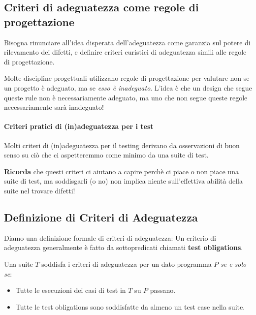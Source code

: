 \subsection*{Criteri di adeguatezza come regole di progettazione}
Bisogna rinunciare all'idea disperata dell'adeguatezza come garanzia sul potere di rilevamento dei difetti,
e definire criteri euristici di adeguatezza simili alle regole di progettazione.

Molte discipline progettuali utilizzano regole di progettazione per valutare non se un progetto è
adeguato, ma se \emph{esso è inadeguato}.
L'idea è che un design che segue queste rule non è necessariamente adeguato, ma uno che non segue queste regole necessariamente sarà inadeguato!

\paragraph{Criteri pratici di (in)adeguatezza per i test}
Molti criteri di (in)adeguatezza per il testing derivano da osservazioni di buon senso su ciò che ci aspetteremmo come minimo da una suite di test.

\textbf{Ricorda} che questi criteri ci aiutano a capire perchè ci piace o non piace una suite di test,
ma soddisgarli (o no) non implica niente sull'effettiva abilità della suite nel trovare difetti!

\subsection{Definizione di Criteri di Adeguatezza}
Diamo una definizione formale di criteri di adeguatezza:
Un criterio di adeguatezza generalmente è fatto da sottopredicati chiamati \textbf{test obligations}.

Una suite $T$ soddisfa i criteri di adeguatezza per un dato programma $P$ \emph{se e solo se}:
\begin{itemize}
    \item Tutte le esecuzioni dei casi di test in $T$ su $P$ passano.
    \item Tutte le test obligations sono soddisfatte da almeno un test case nella suite.
\end{itemize}

